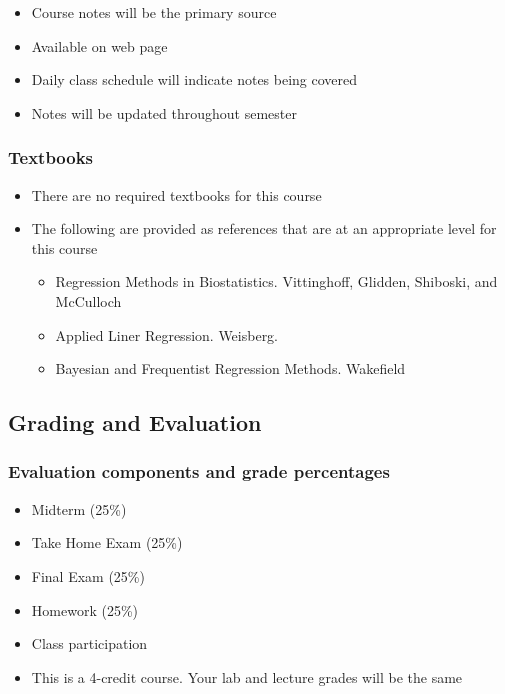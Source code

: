 \documentclass[
  letterpaper,
  DIV=11,
  numbers=noendperiod]{scrartcl}
\providecommand{\tightlist}{%
  \setlength{\itemsep}{0pt}\setlength{\parskip}{0pt}}\usepackage{longtable,booktabs,array}
\begin{document}
\begin{itemize}
\tightlist
\item
  Course notes will be the primary source
\item
  Available on web page
\item
  Daily class schedule will indicate notes being covered
\item
  Notes will be updated throughout semester
\end{itemize}

\hypertarget{textbooks}{%
\subsubsection{Textbooks}\label{textbooks}}

\begin{itemize}
\item
  There are no required textbooks for this course
\item
  The following are provided as references that are at an appropriate
  level for this course

  \begin{itemize}
  \item
    Regression Methods in Biostatistics. Vittinghoff, Glidden, Shiboski,
    and McCulloch
  \item
    Applied Liner Regression. Weisberg.
  \item
    Bayesian and Frequentist Regression Methods. Wakefield
  \end{itemize}
\end{itemize}

\hypertarget{grading-and-evaluation}{%
\subsection{Grading and Evaluation}\label{grading-and-evaluation}}

\hypertarget{evaluation-components-and-grade-percentages}{%
\subsubsection{Evaluation components and grade
percentages}\label{evaluation-components-and-grade-percentages}}

\begin{itemize}
\tightlist
\item
  Midterm (25\%)
\item
  Take Home Exam (25\%)
\item
  Final Exam (25\%)
\item
  Homework (25\%)
\item
  Class participation
\item
  This is a 4-credit course. Your lab and lecture grades will be the
  same
\end{itemize}
\end{document}

